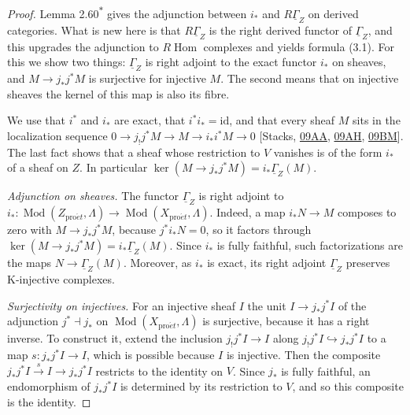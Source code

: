 \documentclass[11pt]{article}
\newcommand{\bpout}[1]{#1\textsuperscript{\hyperlink{bp-outside}{\ensuremath{\ast}}}}
\begin{document}
\begin{proof}[{Proof}]\label{bp66}%
Lemma \bpout{2.60} gives the adjunction between \(i_*\) and \(R\underline\Gamma_Z\) on derived categories. What is new here is that \(R\underline\Gamma_Z\) is the right derived functor of \(\underline\Gamma_Z\), and this upgrades the adjunction to \(R\!\operatorname{Hom}\) complexes and yields formula (3.1). For this we show two things: \(\underline\Gamma_Z\) is right adjoint to the exact functor \(i_*\) on sheaves, and \(M\to j_*j^*M\) is surjective for injective \(M\). The second means that on injective sheaves the kernel of this map is also its fibre.

We use that \(i^*\) and \(i_*\) are exact, that \(i^*i_*=\mathrm{id}\), and that every sheaf \(M\) sits in the localization sequence \(0\to j_!j^*M\to M\to i_*i^*M\to0\) [Stacks, \href{https://stacks.math.columbia.edu/tag/09AA}{09AA}, \href{https://stacks.math.columbia.edu/tag/09AH}{09AH}, \href{https://stacks.math.columbia.edu/tag/09BM}{09BM}]. The last fact shows that a sheaf whose restriction to \(V\) vanishes is of the form \(i_*\) of a sheaf on \(Z\). In particular \(\ker(M\to j_*j^*M)=i_*\underline\Gamma_Z(M)\).

\emph{Adjunction on sheaves.} The functor \(\underline\Gamma_Z\) is right adjoint to \(i_*:\operatorname{Mod}(Z_{\mathrm{pro}\acute{e}t},\Lambda)\to\operatorname{Mod}(X_{\mathrm{pro}\acute{e}t},\Lambda)\). Indeed, a map \(i_*N\to M\) composes to zero with \(M\to j_*j^*M\), because \(j^*i_*N=0\), so it factors through \(\ker(M\to j_*j^*M)=i_*\underline\Gamma_Z(M)\). Since \(i_*\) is fully faithful, such factorizations are the maps \(N\to\underline\Gamma_Z(M)\). Moreover, as \(i_*\) is exact, its right adjoint \(\underline\Gamma_Z\) preserves K-injective complexes.

\emph{Surjectivity on injectives.} For an injective sheaf \(I\) the unit \(I\to j_*j^*I\) of the adjunction \(j^*\dashv j_*\) on \(\operatorname{Mod}(X_{\mathrm{pro}\acute{e}t},\Lambda)\) is surjective, because it has a right inverse. To construct it, extend the inclusion \(j_!j^*I\to I\) along \(j_!j^*I\hookrightarrow j_*j^*I\) to a map \(s:j_*j^*I\to I\), which is possible because \(I\) is injective. Then the composite \(j_*j^*I\xrightarrow{s}I\to j_*j^*I\) restricts to the identity on \(V\). Since \(j_*\) is fully faithful, an endomorphism of \(j_*j^*I\) is determined by its restriction to \(V\), and so this composite is the identity.


\end{proof}
\end{document}
